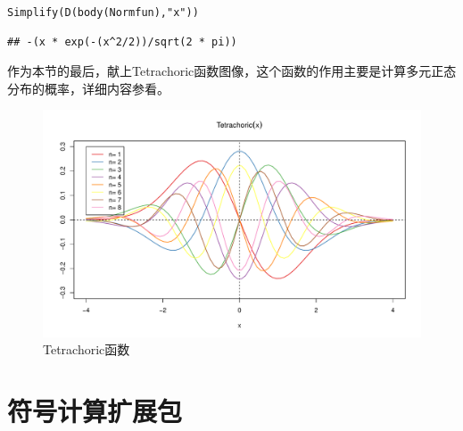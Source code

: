 \documentclass[a4paper]{ctexart}\usepackage[]{graphicx}\usepackage[]{color}
\makeatletter
\newcommand{\hlstr}[1]{\textcolor[rgb]{1,0.4,0.2}{#1}}%
\newcommand{\hlstd}[1]{\textcolor[rgb]{0.251,0.251,0.251}{#1}}%
\newcommand{\hlkwd}[1]{\textcolor[rgb]{0.69,0.188,0.941}{#1}}%
\newenvironment{kframe}{%
 \def\at@end@of@kframe{}%
 \ifinner\ifhmode%
  \def\at@end@of@kframe{\end{minipage}}%
  \begin{minipage}{\columnwidth}%
 \fi\fi%
 \def\FrameCommand##1{\hskip\@totalleftmargin \hskip-\fboxsep
 \colorbox{shadecolor}{##1}\hskip-\fboxsep
     \hskip-\linewidth \hskip-\@totalleftmargin \hskip\columnwidth}%
 \MakeFramed {\advance\hsize-\width
   \@totalleftmargin\z@ \linewidth\hsize
   \@setminipage}}%
 {\par\unskip\endMakeFramed%
 \at@end@of@kframe}
\newenvironment{knitrout}{}{} %
\makeatother
\begin{document}
\begin{knitrout}
\color{fgcolor}\begin{kframe}
\begin{alltt}
\hlkwd{Simplify}\hlstd{(}\hlkwd{D}\hlstd{(}\hlkwd{body}\hlstd{(Normfun),} \hlstr{"x"}\hlstd{))}
\end{alltt}
\begin{verbatim}
## -(x * exp(-(x^2/2))/sqrt(2 * pi))
\end{verbatim}
\end{kframe}
\end{knitrout}
作为本节的最后，献上Tetrachoric函数图像，这个函数的作用主要是计算多元正态分布的概率，详细内容参看\cite{Harris1980The}。

\begin{figure}[htb]
  \centering
    \includegraphics[width=.8\textwidth,height=.4\textwidth]{figure/Tetrachoric.pdf}
  \caption{Tetrachoric函数}
\end{figure} 

\section{符号计算扩展包}
\end{document}
